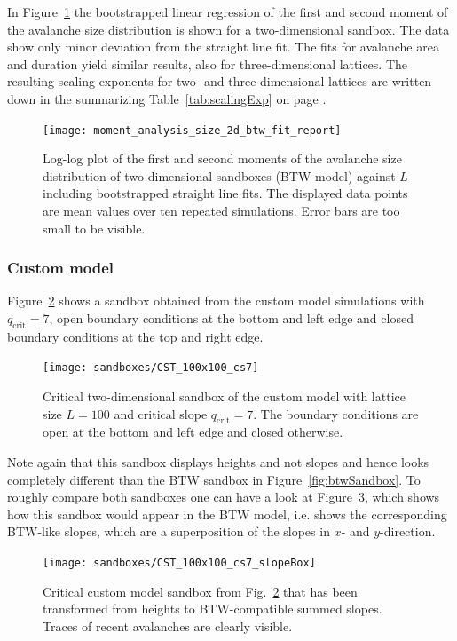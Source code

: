 In Figure~\ref{fig:btwSizeFit} the bootstrapped linear regression of the first and second moment of the avalanche size
distribution is shown for a two-dimensional sandbox. The data show only minor deviation from the straight line fit.
The fits for avalanche area and duration yield similar results, also for three-dimensional lattices.
The resulting scaling exponents for two- and three-dimensional lattices are written down in the summarizing
Table~\ref{tab:scalingExp} on page \pageref{tab:scalingExp}.
\begin{figure}[htb]
    \centering
    \texttt{[image: moment\_analysis\_size\_2d\_btw\_fit\_report]}
    \caption{Log-log plot of the first and second moments of the avalanche size distribution of two-dimensional
             sandboxes (BTW model) against $L$ including bootstrapped straight line fits.
             The displayed data points are mean values over ten repeated simulations.
             Error bars are too small to be visible.}
    \label{fig:btwSizeFit}
\end{figure}

\subsubsection{Custom model}
Figure~\ref{fig:customSandbox} shows a sandbox obtained from the custom model simulations with $q_{\mathrm{crit}}=7$,
open boundary conditions at the bottom and left edge and closed boundary conditions at the top and right edge.
\begin{figure}[htb]
    \centering
    \texttt{[image: sandboxes/CST\_100x100\_cs7]}
    \caption{Critical two-dimensional sandbox of the custom model with lattice size $L=100$ and
             critical slope $q_{\mathrm{crit}}=7$.
             The boundary conditions are open at the bottom and left edge and closed otherwise.}
    \label{fig:customSandbox}
\end{figure}

Note again that this sandbox displays heights and not slopes and hence looks completely different than the BTW sandbox
in Figure~\ref{fig:btwSandbox}. To roughly compare both sandboxes one can have a look at Figure~\ref{fig:cstSlopebox},
which shows how this sandbox would appear in the BTW model, i.e. shows the corresponding BTW-like slopes, which are
a superposition of the slopes in $x$- and $y$-direction.
\begin{figure}[htb]
    \centering
    \texttt{[image: sandboxes/CST\_100x100\_cs7\_slopeBox]}
    \caption{Critical custom model sandbox from Fig.~\ref{fig:customSandbox} that has been transformed from heights to
             BTW-compatible summed slopes. Traces of recent avalanches are clearly visible.}
    \label{fig:cstSlopebox}
\end{figure}

